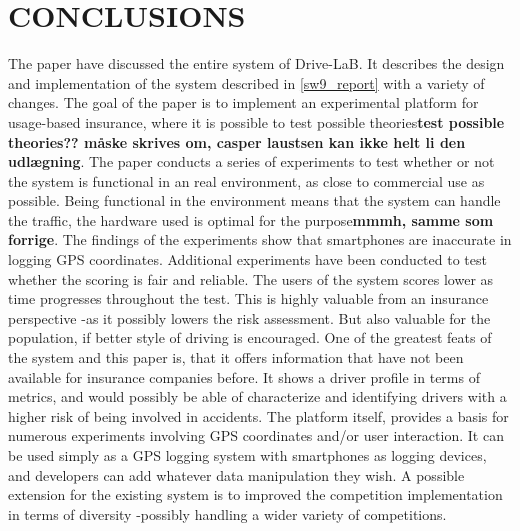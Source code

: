 \section{CONCLUSIONS}\label{sec:conclusion}
The paper have discussed the entire system of Drive-LaB. It describes the design and implementation of the system described in \ref{sw9_report} with a variety of changes. The goal of the paper is to implement an experimental platform for usage-based insurance, where it is possible to test possible theories\textbf{test possible theories?? måske skrives om, casper laustsen kan ikke helt li den udlægning}. The paper conducts a series of experiments to test whether or not the system is functional in an real environment, as close to commercial use as possible. Being functional in the environment means that the system can handle the traffic, the hardware used is optimal for the purpose\textbf{mmmh, samme som forrige}. The findings of the experiments show that smartphones are inaccurate in logging GPS coordinates. 
Additional experiments have been conducted to test whether the scoring is fair and reliable. The users of the system scores lower as time progresses throughout the test. This is highly valuable from an insurance perspective -as it possibly lowers the risk assessment. But also valuable for the population, if better style of driving is encouraged.
One of the greatest feats of the system and this paper is, that it offers information that have not been available for insurance companies before. It shows a driver profile in terms of metrics, and would possibly be able of characterize and identifying drivers with a higher risk of being involved in accidents.
The platform itself, provides a basis for numerous experiments involving GPS coordinates and/or user interaction. It can be used simply as a GPS logging system with smartphones as logging devices, and developers can add whatever data manipulation they wish.
A possible extension for the existing system is to improved the competition implementation in terms of diversity -possibly handling a wider variety of competitions.


\addtolength{\textheight}{-12cm}   %
